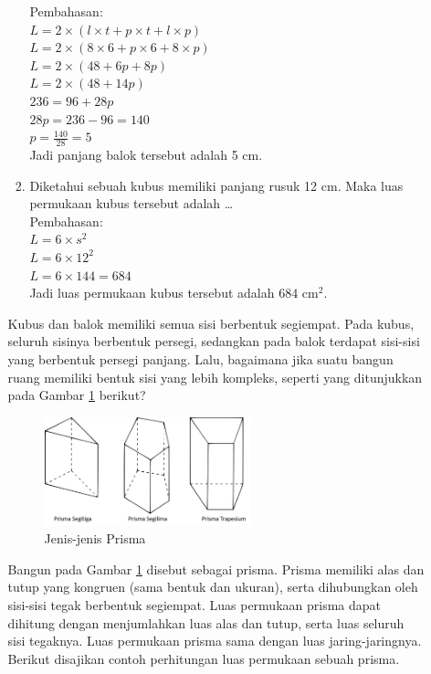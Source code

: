 \documentclass[12pt]{article}
\begin{document}
\begin{enumerate}
\begin{enumerate}
\begin{enumerate}[label=\arabic*)]
            Pembahasan:\\
            $ L = 2 \times (l \times t + p \times t + l \times p) $\\
            $ L = 2 \times (8 \times 6 + p \times 6 + 8 \times p) $\\
            $ L = 2 \times (48+6p+8p)$\\
            $ L = 2 \times (48+14p)$\\
            $ 236 = 96 + 28p $\\
            $ 28p = 236 - 96 = 140 $\\
            $ p = \frac{140}{28} = 5$\\
            Jadi panjang balok tersebut adalah 5 cm.
            \item Diketahui sebuah kubus memiliki panjang rusuk 12 cm. Maka luas permukaan kubus tersebut adalah \dots \\
            Pembahasan:\\
            $ L = 6 \times s^2 $\\
            $ L = 6 \times 12^2$\\
            $ L = 6 \times 144 = 684$\\
            Jadi luas permukaan kubus tersebut adalah \( 684 \text{ cm}^2 \).
        \end{enumerate}
        \hspace*{1cm}Kubus dan balok memiliki semua sisi berbentuk segiempat. Pada kubus, seluruh sisinya berbentuk persegi, sedangkan pada balok terdapat sisi-sisi yang berbentuk persegi panjang. Lalu, bagaimana jika suatu bangun ruang memiliki bentuk sisi yang lebih kompleks, seperti yang ditunjukkan pada Gambar \ref{jenisprisma} berikut?
        \begin{figure}[H]
            \centering
            \includegraphics[width=0.6\textwidth]{images/jenisprisma.png}
            \caption{Jenis-jenis Prisma}
            \label{jenisprisma}
        \end{figure}
        \hspace*{1cm}Bangun pada Gambar \ref{jenisprisma} disebut sebagai prisma. Prisma memiliki alas dan tutup yang kongruen (sama bentuk dan ukuran), serta dihubungkan oleh sisi-sisi tegak berbentuk segiempat. Luas permukaan prisma dapat dihitung dengan menjumlahkan luas alas dan tutup, serta luas seluruh sisi tegaknya. Luas permukaan prisma sama dengan luas jaring-jaringnya. Berikut disajikan contoh perhitungan luas permukaan sebuah prisma.

\end{enumerate}
\end{enumerate}
\end{document}
